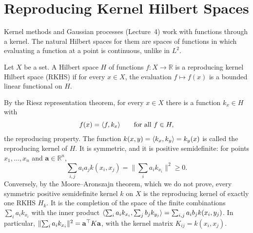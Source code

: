 \section{Reproducing Kernel Hilbert Spaces}\label{A-sec:rkhs}

Kernel methods and Gaussian processes (Lecture~4) work with functions through a kernel. The natural Hilbert spaces for them are spaces of functions in which evaluating a function at a point is continuous, unlike in $L^2$.

\begin{definition}\label{A-def:rkhs}
    Let $X$ be a set. A Hilbert space $H$ of functions $f: X \to \mathbb{R}$ is a reproducing kernel Hilbert space (RKHS) if for every $x \in X$, the evaluation $f \mapsto f(x)$ is a bounded linear functional on $H$.
\end{definition}

By the Riesz representation theorem, for every $x \in X$ there is a function $k_x \in H$ with
\[f(x) = \langle f, k_x \rangle \qquad \text{for all } f \in H,\]
the reproducing property. The function $k(x, y) = \langle k_x, k_y \rangle = k_y(x)$ is called the reproducing kernel of $H$. It is symmetric, and it is positive semidefinite: for points $x_1, \ldots, x_n$ and $\mathbf{a} \in \mathbb{R}^n$,
\[\sum_{i, j} a_ia_jk(x_i, x_j) = \Big\|\sum_i a_ik_{x_i}\Big\|^2 \geq 0.\]
Conversely, by the Moore--Aronszajn theorem, which we do not prove, every symmetric positive semidefinite kernel $k$ on $X$ is the reproducing kernel of exactly one RKHS $H_k$. It is the completion of the space of the finite combinations $\sum_i a_ik_{x_i}$ with the inner product $\langle \sum_i a_ik_{x_i}, \sum_j b_jk_{y_j} \rangle = \sum_{i, j} a_ib_jk(x_i, y_j)$. In particular, $\lVert \sum_i a_ik_{x_i} \rVert^2 = \mathbf{a}^\top K\mathbf{a}$, with the kernel matrix $K_{ij} = k(x_i, x_j)$.


